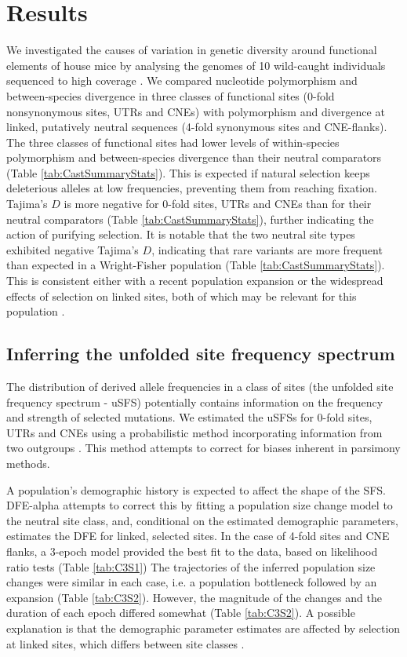 \section{Results}

	We investigated the causes of variation in genetic diversity around functional elements of house mice by analysing the genomes of 10 wild-caught individuals sequenced to high coverage \citep{RN122}. We compared nucleotide polymorphism and between-species divergence in three classes of functional sites (0-fold nonsynonymous sites, UTRs and CNEs) with polymorphism and divergence at linked, putatively neutral sequences (4-fold synonymous sites and CNE-flanks). The three classes of functional sites had lower levels of within-species polymorphism and between-species divergence than their neutral comparators (Table \ref{tab:CastSummaryStats}). This is expected if natural selection keeps deleterious alleles at low frequencies, preventing them from reaching fixation. Tajima’s $D$ is more negative for 0-fold sites, UTRs and CNEs than for their neutral comparators (Table \ref{tab:CastSummaryStats}), further indicating the action of purifying selection. It is notable that the two neutral site types exhibited negative Tajima’s $D$, indicating that rare variants are more frequent than expected in a Wright-Fisher population (Table \ref{tab:CastSummaryStats}). This is consistent either with a recent population expansion or the widespread effects of selection on linked sites, both of which may be relevant for this population \citep{RN122,RN340}. 
	
\linespread{1}

\linespread{2}

\subsection{Inferring the unfolded site frequency spectrum}

	The distribution of derived allele frequencies in a class of sites (the unfolded site frequency spectrum - uSFS) potentially contains information on the frequency and strength of selected mutations. We estimated the uSFSs for 0-fold sites, UTRs and CNEs using a probabilistic method incorporating information from two outgroups \citep{RN321}. This method attempts to correct for biases inherent in parsimony methods. 

	A population's demographic history is expected to affect the shape of the SFS. DFE-alpha attempts to correct this by fitting a population size change model to the neutral site class, and, conditional on the estimated demographic parameters, estimates the DFE for linked, selected sites. In the case of 4-fold sites and CNE flanks, a 3-epoch model provided the best fit to the data, based on likelihood ratio tests (Table \ref{tab:C3S1}) The trajectories of the inferred population size changes were similar in each case, i.e. a population bottleneck followed by an expansion (Table \ref{tab:C3S2}). However, the magnitude of the changes and the duration of each epoch differed somewhat (Table \ref{tab:C3S2}). A possible explanation is that the demographic parameter estimates are affected by selection at linked sites, which differs between site classes \citep{RN149, RN241, RN242}. 

